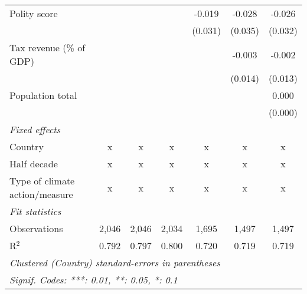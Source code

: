 \begin{tabular}{lcccccc}
   Polity score                                                             &               &               &               & -0.019       & -0.028  & -0.026\\   
                                                                            &               &               &               & (0.031)      & (0.035) & (0.032)\\   
   Tax revenue (\% of GDP)                                                  &               &               &               &              & -0.003  & -0.002\\   
                                                                            &               &               &               &              & (0.014) & (0.013)\\   
   Population total                                                         &               &               &               &              &         & 0.000\\   
                                                                            &               &               &               &              &         & (0.000)\\   
   \emph{Fixed effects}\\
   Country                                                                  & x             & x             & x             & x            & x       & x\\  
   Half decade                                                              & x             & x             & x             & x            & x       & x\\  
   Type of climate action/measure                                           & x             & x             & x             & x            & x       & x\\  
   \midrule \emph{Fit statistics}\\
   Observations                                                             & 2,046         & 2,046         & 2,034         & 1,695        & 1,497   & 1,497\\  
   R$^2$                                                                    & 0.792         & 0.797         & 0.800         & 0.720        & 0.719   & 0.719\\  
   \midrule
   \multicolumn{7}{l}{\emph{Clustered (Country) standard-errors in parentheses}}\\
   \multicolumn{7}{l}{\emph{Signif. Codes: ***: 0.01, **: 0.05, *: 0.1}}\\
\end{tabular}
\par\endgroup


